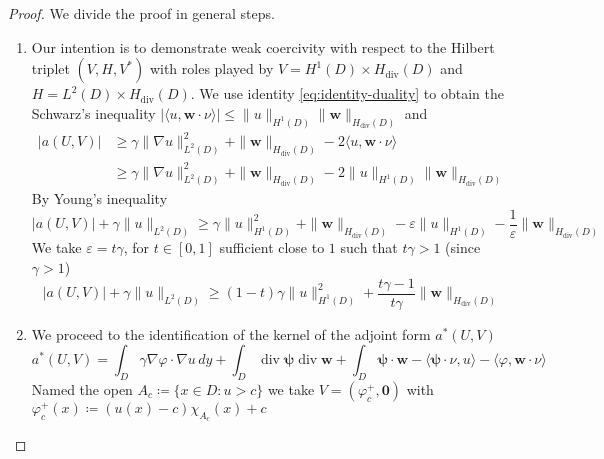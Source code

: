 \documentclass[10pt, a4paper, twoside, openright]{book}
\theoremstyle{definition}
\theoremstyle{plain}
\theoremstyle{plain}
\theoremstyle{plain}
\theoremstyle{plain}
\theoremstyle{plain}
\theoremstyle{plain}
\theoremstyle{plain}
\theoremstyle{plain}
\DeclareMathOperator{\divergence}{div}
\DeclareMathOperator{\real}{Re}
\let\phi\varphi
\let\epsilon\varepsilon
\begin{document}
\begin{proof}
We divide the proof in general steps.
 \begin{enumerate}
 \item 
 Our intention is to demonstrate weak coercivity with respect to the Hilbert triplet $(V,H,V^*)$ with roles played by $V=H^1(D)\times H_{\divergence}(D)$ and $H=L^2(D)\times H_{\divergence}(D)$.
 We use identity \eqref{eq:identity-duality} to obtain the Schwarz's inequality $|\langle u ,\bm{w}\cdot\nu\rangle |\leq\|u\|_{H^1(D)}\|\bm{w}\|_{H_{\divergence}(D)}$ and
\begin{align}
 |a(U,V)|&\geq \gamma\|\nabla u\|_{L^2(D)}^2 + \|\bm{w}\|_{H_{\divergence}(D)}-2\langle u ,\bm{w}\cdot\nu\rangle \\
 &\geq \gamma\|\nabla u\|_{L^2(D)}^2 + \|\bm{w}\|_{H_{\divergence}(D)}-2\|u\|_{H^1(D)}\|\bm{w}\|_{H_{\divergence}(D)}
 \end{align}
 By Young's inequality
 \begin{equation}
 |a(U,V)| + \gamma\|u\|_{L^2(D)} \geq \gamma\|u\|_{H^1(D)}^2 + \|\bm{w}\|_{H_{\divergence}(D)}-\epsilon\|u\|_{H^1(D)} - \frac{1}{\epsilon}\|\bm{w}\|_{H_{\divergence}(D)}
 \end{equation}
 We take $\epsilon=t\gamma$, for $t\in[0,1]$ sufficient close to $1$ such that $t\gamma>1$ (since $\gamma>1$)
 \begin{equation}
  |a(U,V)| + \gamma\|u\|_{L^2(D)}\geq (1-t)\gamma\|u\|_{H^1(D)}^2 + \frac{t\gamma - 1}{t\gamma}\|\bm{w}\|_{H_{\divergence}(D)}
 \end{equation}
 \item We proceed to the identification of the kernel of the adjoint form $a^*(U,V)$ 
\begin{equation*}
  a^*(U,V)= \int_D \gamma \nabla \phi \cdot\nabla u\,dy + \int_D\divergence \bm{\psi}\divergence\bm{w} + \int_D\bm{\psi}\cdot\bm{w} - \langle \bm{\psi}\cdot\nu, u \rangle- \langle \phi,\bm{w}\cdot\nu\rangle
\end{equation*}
 Named the open $A_c\coloneqq\{x\in D: u>c\}$ we take $V=(\phi_c^+, \bm{0})$ with $\phi_c^+(x)\coloneqq (u(x)-c)\chi_{A_c}(x) + c$
\begin{equation*}

\end{equation*}
\end{enumerate}
\end{proof}
\end{document}
